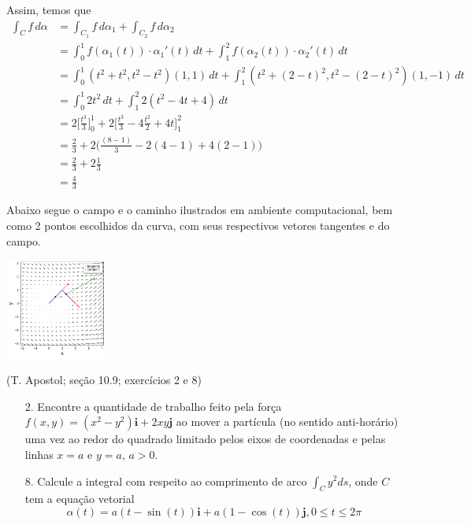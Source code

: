 \documentclass[../main.tex]{subfiles}
\begin{document}
\begin{solucao}
\begin{enumerate}
			Assim, temos que
			\begin{align*}
				\int_C f\, d\alpha
				&=\int_{C_1} f\, d\alpha_1+\int_{C_2} f\, d\alpha_2\\
				&=\int_{0}^1 f(\alpha_1(t))\cdot \alpha_1'(t)\, dt+\int_{1}^2 f(\alpha_2(t))\cdot \alpha_2'(t)\, dt\\
				&=\int_{0}^1 (t^2+t^2, t^2-t^2)(1,1)\, dt+\int_{1}^2 (t^2+(2-t)^2, t^2-(2-t)^2)(1,-1)\, dt\\
				&=\int_{0}^1 2t^2\, dt + \int_{1}^2 2(t^2-4t+4)\, dt \\
				&=2\bigg[\frac{t^3}{3}\bigg]_{0}^1+2\bigg[\frac{t^3}{3}-4\frac{t^2}{2}+4t\bigg]_{1}^2\\				&=\frac{2}{3}+2\bigg(\frac{(8-1)}{3}-2(4-1)+4(2-1)\bigg)\\
				&=\frac{2}{3}+2\frac{1}{3}\\
				&=\frac{4}{3}
			\end{align*}
			
			Abaixo segue o campo e o caminho ilustrados em ambiente computacional, bem como 2 pontos escolhidos da curva, com seus respectivos vetores tangentes e do campo.
			\begin{center}
				\includegraphics[width=0.25\textwidth]{imagens/lista06/picture_lista06_q01_item04.png}
			\end{center}
		\end{enumerate}
	\end{solucao}
	
	\begin{exercicio}{2}
		(T. Apostol; seção 10.9; exercícios 2 e 8)
		
		\begin{enumerate}
			\item[2.] Encontre a quantidade de trabalho feito pela força $f(x,y)=(x^2-y^2)\textbf{i}+2xy\textbf{j}$ ao mover a partícula (no sentido anti-horário) uma vez ao redor do quadrado limitado pelos eixos de coordenadas e pelas linhas $x=a$ e $y=a$, $a>0$.
			\item[8.] Calcule a integral com respeito ao comprimento de arco $\int_C y^2 ds$, onde $C$ tem a equação vetorial
			\[
			\alpha(t)=a(t-\sin(t))\textbf{i} + a(1-\cos(t))\textbf{j}, 0\leq t\leq 2\pi
			\]
		\end{enumerate}
	\end{exercicio}
	
\end{document}

